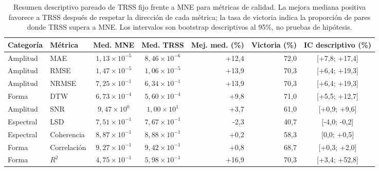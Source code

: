 \begin{table}[htbp]
\centering
\scriptsize
\setlength{\tabcolsep}{3.0pt}
\caption{Resumen descriptivo pareado de TRSS fijo frente a MNE para métricas de calidad. La mejora mediana positiva favorece a TRSS después de respetar la dirección de cada métrica; la tasa de victoria indica la proporción de pares donde TRSS supera a MNE. Los intervalos son bootstrap descriptivos al 95\%, no pruebas de hipótesis.}
\label{tab:ch4_descriptive_trss_mne}
\begin{tabular}{@{}llccrrc@{}}
\toprule
Categoría & Métrica & Med. MNE & Med. TRSS & Mej. med. (\%) & Victoria (\%) & IC descriptivo (\%) \\
\midrule
Amplitud & MAE & $1{,}13\times10^{-5}$ & $8{,}46\times10^{-6}$ & +12{,}4 & 72{,}0 & [+7{,}8; +17{,}4] \\
Amplitud & RMSE & $1{,}47\times10^{-5}$ & $1{,}06\times10^{-5}$ & +13{,}9 & 70{,}3 & [+6{,}4; +19{,}3] \\
Amplitud & NRMSE & $7{,}25\times10^{-1}$ & $6{,}34\times10^{-1}$ & +13{,}9 & 70{,}3 & [+6{,}4; +19{,}3] \\
Forma & DTW & $6{,}73\times10^{-4}$ & $5{,}60\times10^{-4}$ & +9{,}8 & 71{,}0 & [+5{,}5; +12{,}7] \\
Amplitud & SNR & $9{,}47\times10^{0}$ & $1{,}00\times10^{1}$ & +3{,}7 & 61{,}0 & [+0{,}9; +9{,}6] \\
Espectral & LSD & $7{,}51\times10^{-1}$ & $7{,}67\times10^{-1}$ & -2{,}3 & 40{,}7 & [-4{,}0; -0{,}2] \\
Espectral & Coherencia & $8{,}87\times10^{-1}$ & $8{,}88\times10^{-1}$ & +0{,}2 & 58{,}3 & [0{,}0; +0{,}5] \\
Forma & Correlación & $9{,}27\times10^{-1}$ & $9{,}42\times10^{-1}$ & +0{,}8 & 68{,}7 & [+0{,}3; +2{,}0] \\
Forma & $R^2$ & $4{,}75\times10^{-1}$ & $5{,}98\times10^{-1}$ & +16{,}9 & 70{,}3 & [+3{,}4; +52{,}8] \\
\bottomrule
\end{tabular}
\end{table}
